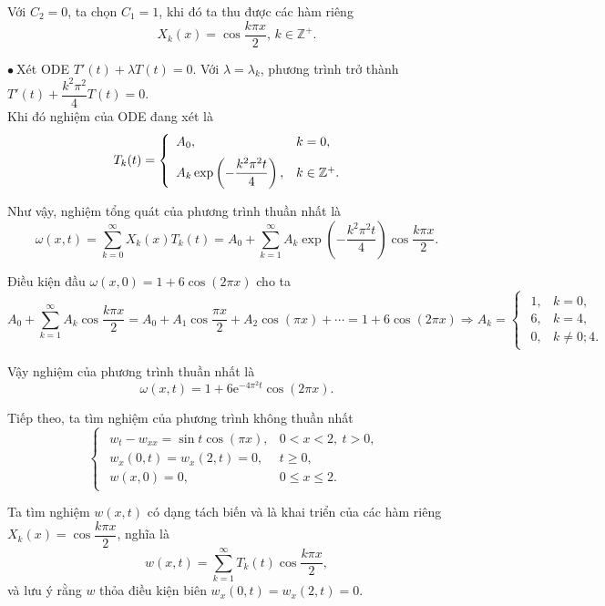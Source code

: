 \documentclass[10pt, a4paper]{article}
\begin{document}
	Với $C_2=0$, ta chọn $C_1=1$, khi đó ta thu được các hàm riêng $$X_k(x)=\cos\frac{k\pi x}{2},\,k\in\mathbb Z^+.$$
	
	$\bullet~$Xét ODE $T'(t)+\lambda T(t)=0$. Với $\lambda=\lambda_k$, phương trình trở thành $T'(t)+\dfrac{k^2\pi^2}{4}T(t)=0$.\\
	
	Khi đó nghiệm của ODE đang xét là $$T_k(t)=\begin{cases}
		\begin{array}{ll}
			A_0, & k=0, \\
			\noalign{\vskip5pt}
			A_k\exp\left(-\dfrac{k^2\pi^2t}{4}\right), & k\in\mathbb Z^+.
		\end{array}
	\end{cases}$$
	
	Như vậy, nghiệm tổng quát của phương trình thuần nhất là $$\omega(x,t)=\sum_{k=0}^\infty X_k(x)T_k(t)=A_0+\sum_{k=1}^\infty A_k\exp\left(-\dfrac{k^2\pi^2t}{4}\right)\cos\frac{k\pi x}{2}.$$
	
	Điều kiện đầu $\omega(x,0)=1+6\cos(2\pi x)$ cho ta $$A_0+\sum_{k=1}^\infty A_k\cos\frac{k\pi x}{2}=A_0+A_1\cos\frac{\pi x}{2}+A_2\cos(\pi x)+\cdots=1+6\cos(2\pi x)\Rightarrow A_k=\begin{cases}
		\begin{array}{ll}
			1, & k=0, \\
			6, & k=4, \\
			0, & k\ne0;4.
		\end{array}
	\end{cases}$$
	
	Vậy nghiệm của phương trình thuần nhất là $$\omega(x,t)=1+6\mathrm e^{-4\pi^2t}\cos(2\pi x).$$
	
	Tiếp theo, ta tìm nghiệm của phương trình không thuần nhất $$\begin{cases}
		\begin{array}{ll}
			w_{t}-w_{xx}=\sin t\cos(\pi x), & 0<x<2,~t>0,\\
			w_x(0,t)=w_x(2,t)=0, & t\ge0,\\
			w(x,0)=0, & 0\le x\le 2.
		\end{array}
	\end{cases}$$
	
	Ta tìm nghiệm $w(x,t)$ có dạng tách biến và là khai triển của các hàm riêng $X_k(x)=\cos\dfrac{k\pi x}{2}$, nghĩa là $$w(x,t)=\sum_{k=1}^\infty T_k(t)\cos\frac{k\pi x}{2},$$
	và lưu ý rằng $w$ thỏa điều kiện biên $w_x(0,t)=w_x(2,t)=0$.\\
	
\end{document}
